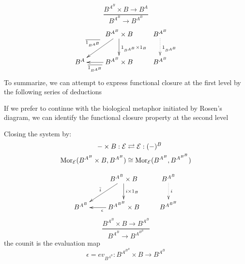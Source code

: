 $$
	\frac{B^{A^B} \times B \longrightarrow B^A}{B^{A^B} \longrightarrow B^{A^B}}
$$
$$
	\xymatrix{
	& B^{A^B} \times B \ar[d]^{1_{B^{A^B}} \times 1_B} 	\ar[dl]_{\overline{1_{B^{A^B}}}} & B^{A^B} \ar@{.>}[d]^{1_{B^{A^B}}}\\
	B^A & B^{A^B} \times B \ar[l]^-{\overline{1_{B^{A^B}}}} & B^{A^B}}
$$
To summarize, we can attempt to express functional closure at the first level by the following series of deductions
\begin{prooftree}
								
\end{prooftree}
If we prefer to continue with the biological metaphor initiated by Rosen's diagram, we can identify the functional closure property at the second level		
\begin{prooftree}
\end{prooftree}
Closing the system by:
\begin{align*}
- \times B: \mathcal{E} & \rightleftarrows \mathcal{E}: (-)^B\\
\Mor_{\mathcal{E}}(B^{A^B} \times B, B^{A^B}) & \cong  \Mor_{\mathcal{E}}(B^{A^B}, B^{A^{B^B}})
\end{align*}

			$$
			\xymatrix{
			& B^{A^B} \times B \ar[d]^-{i \times 1_B} \ar[dl]_{\bar{i}} & B^{A^B} \ar@{.>}[d]^-{i}\\
			B^{A^B} & B^{A^{B^B}} \times B \ar[l]^{\epsilon} & B^{A^{B^B}}
			}
			$$
		$$
			\frac{B^{A^B} \times B \longrightarrow B^{A^B}}{B^{A^B} \longrightarrow B^{A^{B^B}}}
		$$
		the counit is the evaluation map
		$$
			\epsilon = ev_{B^{A^B}} \colon B^{A^{B^B}} \times B \longrightarrow B^{A^B}
		$$
	